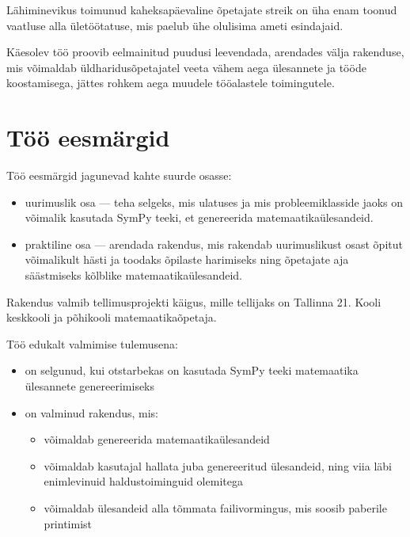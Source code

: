 Lähiminevikus toimunud kaheksapäevaline õpetajate streik\cite{hm-opetajate-streik} on üha enam toonud vaatluse alla ületöötatuse, mis paelub ühe olulisima ameti esindajaid. 

Käesolev töö proovib eelmainitud puudusi leevendada, arendades välja rakenduse, mis võimaldab üldharidusõpetajatel veeta vähem aega ülesannete ja tööde koostamisega, jättes rohkem aega muudele tööalastele toimingutele.

\section{Töö eesmärgid}

Töö eesmärgid jagunevad kahte suurde osasse: 
\begin{itemize}
  \item uurimuslik osa — teha selgeks, mis ulatuses ja mis probleemiklasside jaoks on võimalik kasutada SymPy teeki, et genereerida matemaatikaülesandeid.
  \item praktiline osa — arendada rakendus, mis rakendab uurimuslikust osast õpitut võimalikult hästi ja toodaks õpilaste harimiseks ning õpetajate aja säästmiseks kõlblike matemaatikaülesandeid.
\end{itemize}

Rakendus valmib tellimusprojekti käigus, mille tellijaks on Tallinna 21. Kooli keskkooli ja põhikooli matemaatikaõpetaja.

Töö edukalt valmimise tulemusena:

\begin{itemize}
  \item on selgunud, kui otstarbekas on kasutada SymPy teeki matemaatika ülesannete genereerimiseks
  \item on valminud rakendus, mis:
  \begin{itemize}
    \item võimaldab genereerida matemaatikaülesandeid
    \item võimaldab kasutajal hallata juba genereeritud ülesandeid, ning viia läbi enimlevinuid haldustoiminguid olemitega
    \item võimaldab ülesandeid alla tõmmata failivormingus, mis soosib paberile printimist
  \end{itemize}
\end{itemize}

